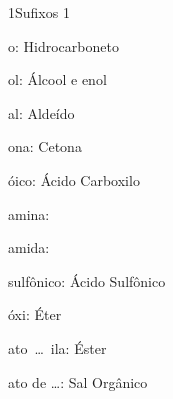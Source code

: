 \documentclass[\mainfilename]{subfiles}
\begin{document}
\begin{sectionBox}1{Sufixos 1} %
    

    \begin{description}
        \begin{multicols}{2}
            \item[o:] Hidrocarboneto 
            \item[ol:] Álcool e enol 
            \item[al:] Aldeído 
            \item[ona:] Cetona 
            \item[óico:] Ácido Carboxilo 
            \item[amina:] 
            \item[amida:] 
            \item[sulfônico:] Ácido Sulfônico 
            \item[óxi:] Éter
            \item[ato\ \dots\ ila:] Éster
            \item[ato de \dots:] Sal Orgânico
        \end{multicols}
    \end{description}
    
\end{sectionBox}
\end{document}
